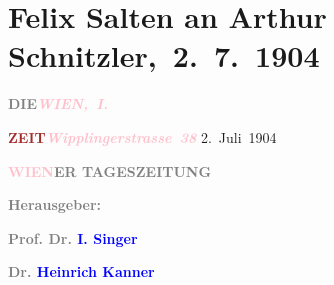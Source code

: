 

\renewcommand{\erwaehntePersonen}{Personen: Gabriele D’Annunzio, Heinrich Kanner, Isidor Singer, Karl Gustav Vollmoeller}
\renewcommand{\erwaehnteInstitutionen}{Institutionen: Die Zeit}
\renewcommand{\erwaehnteOrte}{Orte: Edmund-Weiß-Gasse 7, I., Innere Stadt, Wien, Wipplingerstraße}
\renewcommand{\erwaehnteWerke}{Werke: Die Zeit, Giulia. Drama in einem Akt}
\section[ Felix Salten an Arthur Schnitzler, 2. 7. 1904]{Felix Salten an Arthur Schnitzler, 2. 7. 1904}
\nopagebreak{}
\rehead{ }\normalsize\beginnumbering{}
\toendnotes[C]{\smallbreak\pagebreak[2]}
\toendnotes[C]{\smallbreak}
\pstart
           \noindent{}{\pb}\textcolor{gray}{\textbf{DIE}}\hfill \textcolor{gray}{\textbf{\textcolor{pink}{\emph{WIEN, I.}}{}\ledrightnote{\textcolor{pink}{I., Innere Stadt}}}}\pend
           
\pstart
           \textcolor{gray}{\textbf{\textcolor{brown}{ZEIT}{}\ledrightnote{\textcolor{brown}{Die Zeit}}}}\hfill \textcolor{gray}{\textbf{\emph{\textcolor{pink}{Wipplingerstrasse 38}{}\ledrightnote{\textcolor{pink}{Wipplingerstraße}}}}}{ }2. Juli 1904\pend
           
\pstart
           \textcolor{gray}{\textbf{\textcolor{pink}{WIEN}{}\ledrightnote{\textcolor{pink}{Wien}}ER TAGESZEITUNG}}\pend
           
\pstart
           \textcolor{gray}{\textbf{Herausgeber:}}\pend
           
\pstart
           \textcolor{gray}{\textbf{\textbf{Prof. Dr. \textcolor{blue}{I. Singer}{}\ledrightnote{\textcolor{blue}{Isidor Singer}}}}}\pend
           
\pstart
           \textcolor{gray}{\textbf{\textbf{Dr. \textcolor{blue}{Heinrich Kanner}{}\ledrightnote{\textcolor{blue}{Heinrich Kanner}}}}}\pend
           
